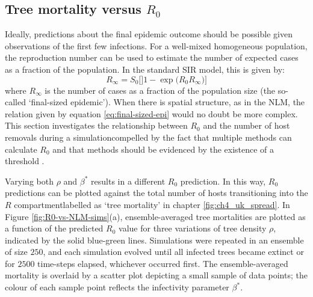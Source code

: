 \subsection{Tree mortality versus $R_0$}

Ideally, predictions about the final epidemic outcome should be possible given observations of the first few infections. 
For a well-mixed homogeneous population, the reproduction number can be used to estimate the number of expected cases as a fraction of the population.
In the standard SIR model, this is given by:
\begin{equation}
\label{eq:final-sized-epi}
    R_{\infty} = S_0\Big[]1 - \exp\big( R_0 R_\infty\big) \Big]
\end{equation}
where $R_\infty$ is the number of cases as a fraction of the population size (the so-called `final-sized epidemic'). 
When there is spatial structure, as in the NLM, the relation given by equation \ref{eq:final-sized-epi} would no doubt be more complex.
This section investigates the relationship between $R_0$ and the number of host removals during a simulation\textemdash compelled by the fact that multiple methods can calculate $R_0$ and that methods should be evidenced by the existence of a threshold \cite{li2011failure}.

Varying both $\rho$ and $\beta^*$ results in a different $R_0$ prediction.
In this way, $R_0$ predictions can be plotted against the total number of hosts transitioning into the $R$ compartment\textemdash labelled as `tree mortality' in chapter \ref{fig:ch4_uk_spread}.
In Figure \ref{fig:R0-vs-NLM-sims}(a), ensemble-averaged tree mortalities are plotted as a function of the predicted $R_0$ value for three variations of tree density $\rho$, indicated by the solid blue-green lines.
Simulations were repeated in an ensemble of size $250$, and each simulation evolved until all infected trees became extinct or for $2500$ time-steps elapsed, whichever occurred first.
The ensemble-averaged mortality is overlaid by a scatter plot depicting a small sample of data points; the colour of each sample point reflects the infectivity parameter $\beta^*$.


